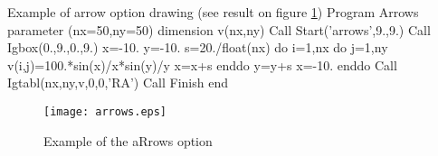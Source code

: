 \bigskip

\begin{XMPt}{Example of arrow option drawing 
             (see result on figure \ref{ARROWS})}
      Program Arrows
      parameter (nx=50,ny=50)
      dimension v(nx,ny)
      Call Start('arrows',9.,9.)
      Call Igbox(0.,9.,0.,9.)
      x=-10.
      y=-10.
      s=20./float(nx)
      do i=1,nx
         do j=1,ny
            v(i,j)=100.*sin(x)/x*sin(y)/y
            x=x+s
         enddo
         y=y+s
         x=-10.
      enddo
      Call Igtabl(nx,ny,v,0,0,'RA')
      Call Finish
      end
\end{XMPt}

\vfill
\clearpage

\begin{figure}[p]
\begin{center} \texttt{[image: arrows.eps]} \end{center}
\caption{Example of the \protect{} aRrows option}
\label{ARROWS}
\end{figure}

\vfill
\clearpage

